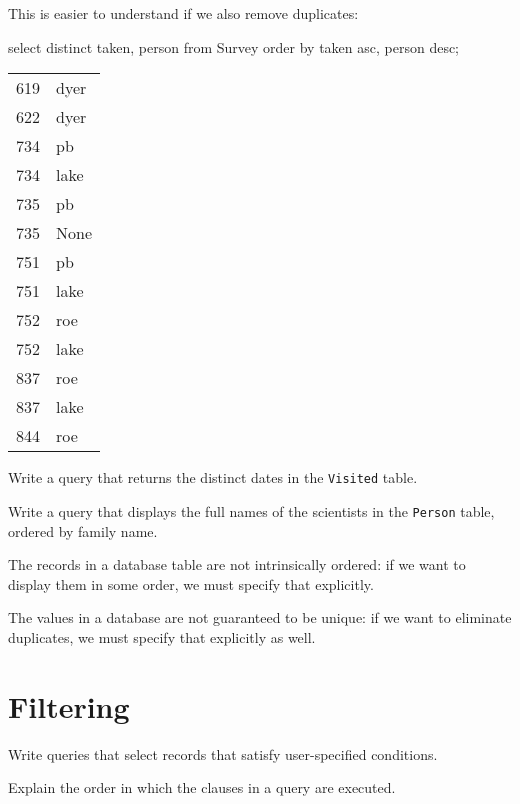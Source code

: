 \documentclass{book}
\begin{document}
This is easier to understand if we also remove duplicates:

\begin{VerbIn}
select distinct taken, person from Survey order by taken asc, person desc;
\end{VerbIn}

\begin{tabular}{ll}
619 & dyer \\
622 & dyer \\
734 & pb \\
734 & lake \\
735 & pb \\
735 & None \\
751 & pb \\
751 & lake \\
752 & roe \\
752 & lake \\
837 & roe \\
837 & lake \\
844 & roe \\
\end{tabular}

\begin{challenge}
  Write a query that returns the distinct dates in the \texttt{Visited}
  table.
\end{challenge}

\begin{challenge}
  Write a query that displays the full names of the scientists in the
  \texttt{Person} table, ordered by family name.
\end{challenge}

\begin{keypoints}
\begin{swcitemize}
\item
  The records in a database table are not intrinsically ordered: if we
  want to display them in some order, we must specify that explicitly.
\item
  The values in a database are not guaranteed to be unique: if we want
  to eliminate duplicates, we must specify that explicitly as well.
\end{swcitemize}
\end{keypoints}

\section{Filtering}

\begin{objectives}
\begin{swcitemize}
\item
  Write queries that select records that satisfy user-specified
  conditions.
\item
  Explain the order in which the clauses in a query are executed.
\end{swcitemize}
\end{objectives}
\end{document}
